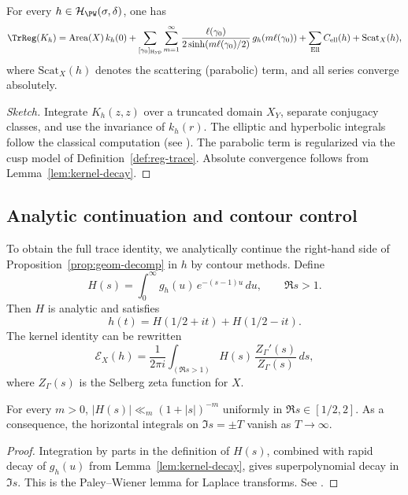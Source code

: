 \begin{proposition}
\label{prop:geom-decomp}
For every $h\in\mathcal{H}_{\PW}(\sigma,\delta)$, one has
\[
\TrReg(K_h)
=\mathrm{Area}(X)\,k_h(0)
+\sum_{[\gamma_0]_{\mathrm{Hyp}}}
\sum_{m=1}^{\infty}
\frac{\ell(\gamma_0)}{2\sinh(m\ell(\gamma_0)/2)}\,
g_h(m\ell(\gamma_0))
+\sum_{\mathrm{Ell}}C_{\mathrm{ell}}(h)
+\mathrm{Scat}_X(h),
\]
where $\mathrm{Scat}_X(h)$ denotes the scattering (parabolic) term,
and all series converge absolutely.                                     %
\end{proposition}

\begin{proof}[Sketch]
Integrate $K_h(z,z)$ over a truncated domain $X_Y$, separate conjugacy
classes, and use the invariance of $k_h(r)$. The elliptic and hyperbolic
integrals follow the classical computation (see
\cite[Ch.~3]{HejhalII}). The parabolic term is regularized via the cusp
model of Definition~\ref{def:reg-trace}. Absolute convergence follows
from Lemma~\ref{lem:kernel-decay}.                                      %
\end{proof}

\subsection{Analytic continuation and contour control}
\label{subsec:analytic-continuation}
\relax\hspace{0pt}

To obtain the full trace identity, we analytically continue the
right-hand side of Proposition~\ref{prop:geom-decomp} in $h$ by contour
methods. Define
\[
H(s)=\int_0^\infty g_h(u)\,e^{-(s-1)u}\,du,\qquad \Re s>1.
\]
Then $H$ is analytic and satisfies
\[
h(t)=H(1/2+it)+H(1/2-it).
\]
The kernel identity can be rewritten
\[
\mathcal{E}_X(h)
=\frac{1}{2\pi i}\int_{(\Re s>1)}H(s)\,\frac{Z_\Gamma'(s)}{Z_\Gamma(s)}\,ds,
\]
where $Z_\Gamma(s)$ is the Selberg zeta function for $X$.                %

\begin{lemma}\label{lem:horizontal-decay}
For every $m>0$, $|H(s)|\ll_m (1+|s|)^{-m}$ uniformly in
$\Re s\in[1/2,2]$. As a consequence, the horizontal integrals on
$\Im s=\pm T$ vanish as $T\to\infty$.                                   %
\end{lemma}

\begin{proof}
Integration by parts in the definition of $H(s)$, combined with
rapid decay of $g_h(u)$ from Lemma~\ref{lem:kernel-decay}, gives
superpolynomial decay in $\Im s$. This is the Paley–Wiener lemma for
Laplace transforms. See \cite[Prop.~2.1]{HejhalII}.                     %
\end{proof}

